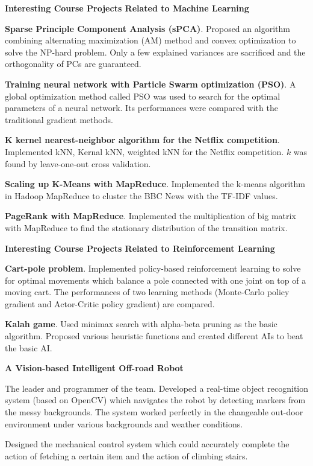 \documentclass[margin,line,11pt]{resume}
\begin{document}
\begin{resume}
\textbf{Interesting Course Projects Related to Machine Learning}
\begin{list2}
\item \textbf{Sparse Principle Component Analysis (sPCA)}. Proposed an algorithm combining alternating maximization (AM) method and convex optimization to solve the NP-hard problem. Only a few explained variances are sacrificed and the orthogonality of PCs are guaranteed. 
\item \textbf{Training neural network with Particle Swarm optimization (PSO)}. A global optimization method called PSO was used to search for the optimal parameters of a neural network.  Its performances were compared with the traditional gradient methods.
\item \textbf{K kernel nearest-neighbor algorithm for the Netflix competition}. Implemented kNN, Kernal kNN, weighted kNN for the Netflix competition. $k$ was found by leave-one-out cross validation. 
\item \textbf{Scaling up K-Means with MapReduce}. Implemented the k-means algorithm in Hadoop MapReduce to cluster the BBC News with the TF-IDF values.
\item \textbf{PageRank with MapReduce}. Implemented the multiplication of big matrix with MapReduce to find the stationary distribution of the transition  matrix. 
\end{list2}


\textbf{Interesting Course Projects Related to Reinforcement Learning}
\begin{list2}        
\item \textbf{Cart-pole problem}. Implemented policy-based reinforcement learning  to solve for optimal movements which balance a pole connected with one joint on top of a moving cart. The performances of two learning methods (Monte-Carlo policy gradient and Actor-Critic policy gradient) are compared. 
\item \textbf{Kalah game}. Used minimax search with alpha-beta pruning as the basic algorithm. Proposed various heuristic functions and created different AIs to beat the basic AI. 
\end{list2}



\textbf{A Vision-based Intelligent Off-road Robot}
\begin{list2}
\item The leader and programmer of the team. Developed a real-time object recognition system (based on OpenCV) which navigates the robot by detecting  markers from the messy backgrounds. The system worked perfectly in the changeable out-door environment under various backgrounds and  weather conditions.
\item Designed the mechanical control system which could accurately complete the action of fetching a certain item and the action of climbing stairs.
\end{list2}






    	

 	

 	       
\end{resume}   
\end{document}
